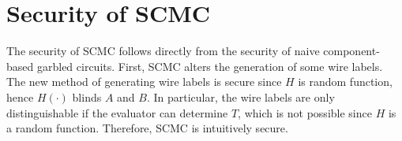 \section{Security of SCMC}
The security of SCMC follows directly from the security of naive component-based garbled circuits. 
First, SCMC alters the generation of some wire labels.
The new method of generating wire labels is secure since $H$ is random function, hence $H(\cdot)$ blinds $A$ and $B$.
In particular, the wire labels are only distinguishable if the evaluator can determine $T$, which is not possible since $H$ is a random function.
Therefore, SCMC is intuitively secure. 










































